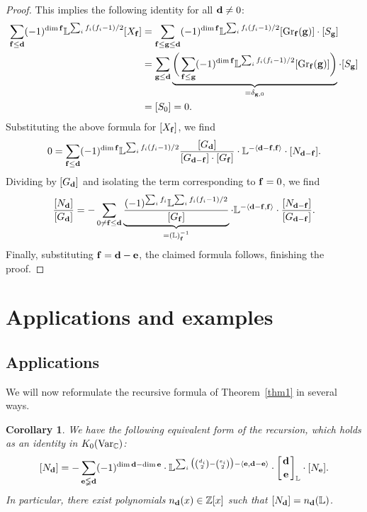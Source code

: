 \documentclass[10pt,a4paper]{amsart}
\numberwithin{equation}{section}
\newtheorem{Corollary}[Theorem]{Corollary}
\theoremstyle{definition}
\begin{document}
\begin{proof}
This implies the following identity for all ${\bf d}\not=0$:
\begin{align*}
\sum_{{\bf f}\leq{\bf d}}(-1)^{\dim{\bf f}}\mathbb{L}^{\sum_i f_i(f_i-1)/2}[X_{\bf f}]&=\sum_{{\bf f}\leq{\bf g}\leq{\bf d}}(-1)^{\dim{\bf f}}\mathbb{L}^{\sum_i f_i(f_i-1)/2}[{\rm Gr}_{\bf f}({\bf g})]\cdot[S_{\bf g}]
\\
&=\sum_{{\bf g}\leq{\bf d}}\underbrace{\bigg(\sum_{{\bf f}\leq{\bf g}}(-1)^{\dim {\bf f}}\mathbb{L}^{\sum_if_i(f_i-1)/2}[{\rm Gr}_{\bf f}({\bf g})]\bigg)}_{=\delta_{{\bf g},{0}}}\cdot[S_{\bf g}]\\
&=[S_{ 0}]=0.
\end{align*}
Substituting the above formula for $[X_{\bf f}]$, we find
\[0=\sum_{{\bf f}\leq{\bf d}}(-1)^{\dim{\bf f}}\mathbb{L}^{\sum_i f_i(f_i-1)/2}\frac{[G_{\bf d}]}{[G_{{\bf d}-{\bf f}}]\cdot[G_{\bf f}]}\cdot\mathbb{L}^{-\langle{\bf d}-{\bf f},{\bf f}\rangle}\cdot[N_{{\bf d}-{\bf f}}].\]
Dividing by $[G_{\bf d}]$ and isolating the term corresponding to ${\bf f}={ 0}$, we find
\[\frac{[N_{\bf d}]}{[G_{\bf d}]}=-\sum_{{0}\not={\bf f}\leq{\bf d}}\underbrace{\frac{(-1)^{\sum_if_i}\mathbb{L}^{\sum_if_i(f_i-1)/2}}{[G_{\bf f}]}}_{=(\mathbb{L})_{{\bf f}}^{-1}}\cdot\mathbb{L}^{-\langle{\bf d}-{\bf f},{\bf f}\rangle}\cdot\frac{[N_{{\bf d}-{\bf f}}]}{[G_{{\bf d}-{\bf f}}]}.\]
Finally, substituting ${\bf f}={\bf d}-{\bf e}$, the claimed formula follows, finishing the proof.\end{proof}

\section{Applications and examples}\label{s3}

\subsection{Applications}

We will now reformulate the recursive formula of Theorem~\ref{thm1} in several ways.

\begin{Corollary}\label{cor31} We have the following equivalent form of the recursion, which holds as an identity in $K_0({\rm Var}_\mathbb{C})$:
\[[N_{\bf d}]=-\sum_{{\bf e}\lneqq{\bf d}}(-1)^{\dim{\bf d}-\dim{\bf e}}\cdot\mathbb{L}^{\sum_i\big({d_i\choose 2}-{e_i\choose 2}\big)-\langle{\bf e},{\bf d}-{\bf e}\rangle}\cdot\left[{{\bf d}\atop{\bf e}}\right]_\mathbb{L}\cdot{[N_{\bf e}]}.\]
In particular, there exist polynomials $n_{\bf d}(x)\in\mathbb{Z}[x]$ such that $[N_{\bf d}]=n_{\bf d}(\mathbb{L})$.
\end{Corollary}
\end{document}
